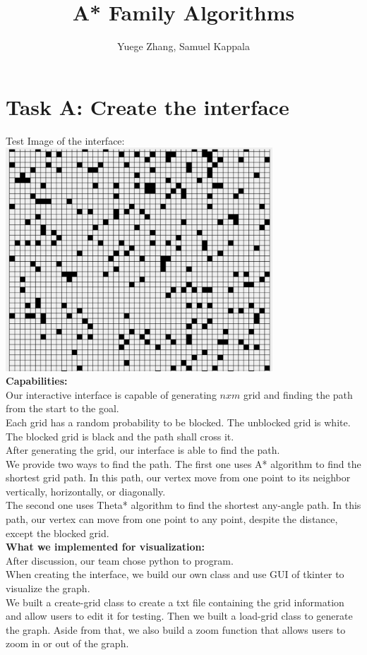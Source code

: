 \documentclass[12pt, letterpaper]{article}
\title{A* Family Algorithms}
\author{Yuege Zhang, Samuel Kappala}
\date{}
\begin{document}
\maketitle

\section{Task A: Create the interface}
Test Image of the interface:\\
\includegraphics[width=10cm]{1a-gridtest}\\
\textbf{Capabilities:}\\
Our interactive interface is capable of generating $nxm$ grid and finding the path from the start to the goal.\\
Each grid has a random probability to be blocked. The unblocked grid is white. The blocked grid is black and the path shall cross it.\\
After generating the grid, our interface is able to find the path.\\
We provide two ways to find the path. The first one uses A* algorithm to find the shortest grid path. In this path, our vertex move from one point to its neighbor vertically, horizontally, or diagonally.\\
The second one uses Theta* algorithm to find the shortest any-angle path. In this path, our vertex can move from one point to any point, despite the distance, except the blocked grid.\\
\textbf{What we implemented for visualization:}\\
After discussion, our team chose python to program.\\
When creating the interface, we build our own class and use GUI of tkinter to visualize the graph.\\
We built a create-grid class to create a txt file containing the grid information and allow users to edit it for testing. Then we built a load-grid class to generate the graph. Aside from that, we also build a zoom function that allows users to zoom in or out of the graph.\\
\end{document}
